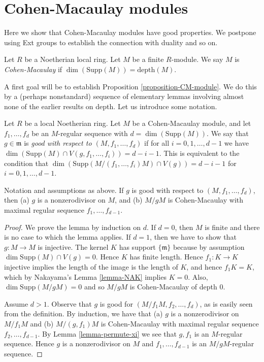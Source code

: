 \section{Cohen-Macaulay modules}
\label{section-CM}

\noindent
Here we show that Cohen-Macaulay modules have good properties. We postpone
using Ext groups to establish the connection with duality and so on.

\begin{definition}
\label{definition-CM}
Let $R$ be a Noetherian local ring.
Let $M$ be a finite $R$-module.
We say $M$ is {\it Cohen-Macaulay}
if $\dim(\text{Supp}(M)) = \text{depth}(M)$.
\end{definition}

\noindent
A first goal will be to establish Proposition \ref{proposition-CM-module}.
We do this by a (perhaps nonstandard) sequence of elementary lemmas
involving almost none of the earlier results on depth. Let us introduce
some notation.

\medskip\noindent
Let $R$ be a local Noetherian ring. Let $M$ be
a Cohen-Macaulay module, and let $f_1, \ldots, f_d$
be an $M$-regular sequence with $d = \dim(\text{Supp}(M))$.
We say that $g \in \mathfrak m$ is {\it good with respect to
$(M, f_1, \ldots, f_d)$} if for all $i = 0, 1, \ldots, d-1$
we have $\dim (\text{Supp}(M) \cap V(g, f_1, \ldots, f_i))
= d - i - 1$. This is equivalent to the condition that
$\dim(\text{Supp}(M/(f_1, \ldots, f_i)M) \cap V(g)) =
d - i - 1$ for $i = 0, 1, \ldots, d - 1$.

\begin{lemma}
\label{lemma-good-element}
Notation and assumptions as above. If $g$ is good with respect to
$(M, f_1, \ldots, f_d)$, then (a) $g$ is a nonzerodivisor on $M$,
and (b) $M/gM$ is Cohen-Macaulay with maximal regular
sequence $f_1, \ldots, f_{d - 1}$.
\end{lemma}

\begin{proof}
We prove the lemma by induction on $d$.
If $d = 0$, then $M$ is finite and there is no case
to which the lemma applies.
If $d = 1$, then we have to show that $g : M \to M$ is
injective. The kernel $K$ has support $\{\mathfrak m\}$
because by assumption $\dim \text{Supp}(M) \cap V(g) = 0$.
Hence $K$ has finite length. Hence $f_1 : K \to K$ injective
implies the length of the image is the length of $K$, and hence
$f_1 K = K$, which by Nakayama's Lemma \ref{lemma-NAK} implies $K = 0$.
Also, $\dim \text{Supp}(M/gM) = 0$ and so $M/gM$ is Cohen-Macaulay
of depth $0$.

\medskip\noindent
Assume $d > 1$. Observe that $g$ is good for $(M/f_1M, f_2, \ldots, f_d)$,
as is easily seen from the definition. By induction, we have that
(a) $g$ is a nonzerodivisor on $M/f_1M$ and
(b) $M/(g, f_1)M$ is Cohen-Macaulay with maximal regular sequence
$f_2, \ldots, f_{d - 1}$. By
Lemma \ref{lemma-permute-xi}
we see that $g, f_1$ is an $M$-regular sequence.
Hence $g$ is a nonzerodivisor on $M$ and
$f_1, \ldots, f_{d - 1}$ is an $M/gM$-regular sequence.
\end{proof}

